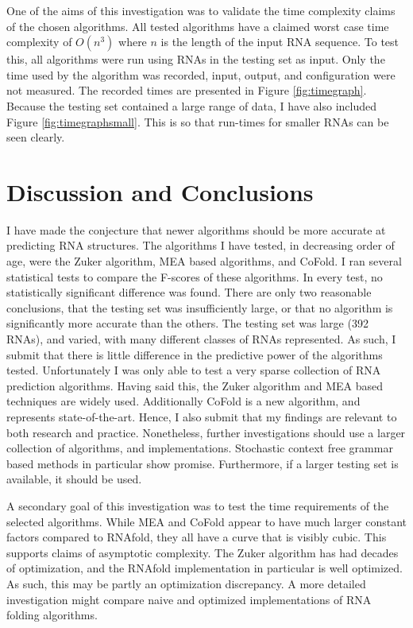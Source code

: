 \documentclass[12pt, a4paper]{article}
\begin{document}
One of the aims of this investigation was to validate the time complexity claims of the chosen algorithms. All tested algorithms have a claimed worst case time complexity of $O(n^3)$ where $n$ is the length of the input RNA sequence. To test this, all algorithms were run using RNAs in the testing set as input. Only the time used by the algorithm was recorded, input, output, and configuration were not measured. The recorded times are presented in Figure \ref{fig:timegraph}. Because the testing set contained a large range of data, I have also included Figure \ref{fig:timegraphsmall}. This is so that run-times for smaller RNAs can be seen clearly.



\section{Discussion and Conclusions}
I have made the conjecture that newer algorithms should be more accurate at predicting RNA structures. The algorithms I have tested, in decreasing order of age, were the Zuker algorithm, MEA based algorithms, and CoFold. I ran several statistical tests to compare the F-scores of these algorithms. In every test, no statistically significant difference was found. There are only two reasonable conclusions, that the testing set was insufficiently large, or that no algorithm is significantly more accurate than the others. The testing set was large (392 RNAs), and varied, with many different classes of RNAs represented. As such, I submit that there is little difference in the predictive power of the algorithms tested. Unfortunately I was only able to test a very sparse collection of RNA prediction algorithms. Having said this, the Zuker algorithm and MEA based techniques are widely used. Additionally CoFold is a new algorithm, and represents state-of-the-art. Hence, I also submit that my findings are relevant to both research and practice. Nonetheless, further investigations should use a larger collection of algorithms, and implementations. Stochastic context free grammar based methods in particular show promise. Furthermore, if a larger testing set is available, it should be used.

A secondary goal of this investigation was to test the time requirements of the selected algorithms. While MEA and CoFold appear to have much larger constant factors compared to RNAfold, they all have a curve that is visibly cubic. This supports claims of asymptotic complexity. The Zuker algorithm has had decades of optimization, and the RNAfold implementation in particular is well optimized. As such, this may be partly an optimization discrepancy. A more detailed investigation might compare naive and optimized implementations of RNA folding algorithms.
\end{document}
